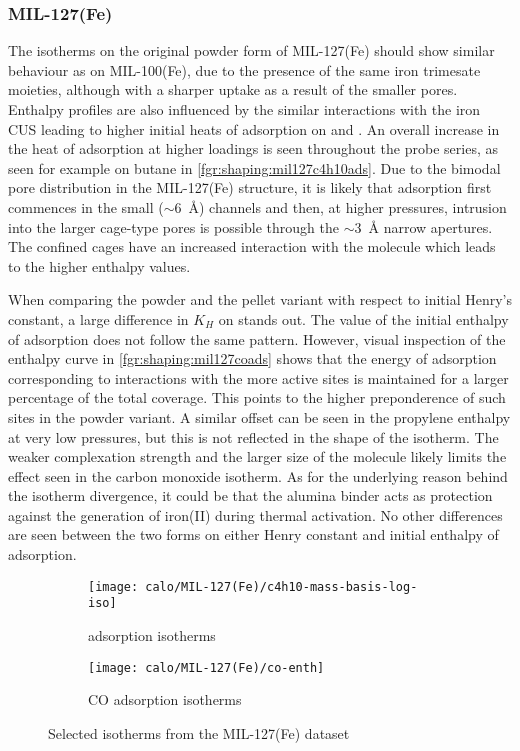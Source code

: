 
\subsubsection{MIL-127(Fe)}

The isotherms on the original powder form of MIL-127(Fe)
should show similar behaviour as on MIL-100(Fe),
due to the presence of the same iron trimesate moieties,
although with a sharper uptake as a result of the smaller pores. Enthalpy
profiles are also influenced by the similar interactions with the iron
CUS leading to higher initial heats of adsorption on  and .
An overall increase in the heat of adsorption at higher loadings is seen
throughout the probe series, as seen for example on butane in
\autoref{fgr:shaping:mil127c4h10ads}.
Due to the bimodal pore distribution in the MIL-127(Fe) structure,
it is likely that adsorption first commences in the small
(\( \sim \)\SI{6}{\angstrom}) channels and then, at higher pressures,
intrusion into the larger cage-type pores is possible through the
\( \sim \)\SI{3}{\angstrom} narrow apertures.
The confined cages have an increased interaction with the molecule
which leads to the higher enthalpy values.

When comparing the powder and the pellet variant with respect to
initial Henry's constant, a large difference in \(K_H\) on 
stands out. The value of the initial enthalpy of adsorption
does not follow the same pattern.
However, visual inspection of the enthalpy curve in
\autoref{fgr:shaping:mil127coads} shows that the energy of
adsorption corresponding to
interactions with the more active sites is maintained for a larger
percentage of the total coverage.
This points to the higher preponderence of such sites in the powder
variant. A similar offset can be seen in the propylene enthalpy at very
low pressures, but this is not reflected in the shape of the isotherm.
The weaker complexation strength and the larger size of the molecule
likely limits the effect seen in the carbon monoxide isotherm.
As for the underlying reason behind the isotherm divergence, it
could be that the alumina binder acts as protection against the
generation of iron(II) during thermal activation.
No other differences are seen between the two forms on either Henry
constant and initial enthalpy of adsorption.

\begin{figure}[htb]
	\centering
	\begin{subfigure}{0.45\textwidth}
		\texttt{[image: calo/MIL-127(Fe)/c4h10-mass-basis-log-iso]}
		\caption{ adsorption isotherms}%
		\label{fgr:shaping:mil127c4h10ads}
	\end{subfigure}
	\begin{subfigure}{0.45\textwidth}
		\texttt{[image: calo/MIL-127(Fe)/co-enth]}
		\caption{CO adsorption isotherms}%
		\label{fgr:shaping:mil127coads}
	\end{subfigure}%
	\caption{Selected isotherms from the MIL-127(Fe) dataset}%
	\label{fgr:shaping:mil127isotherms}
\end{figure}

